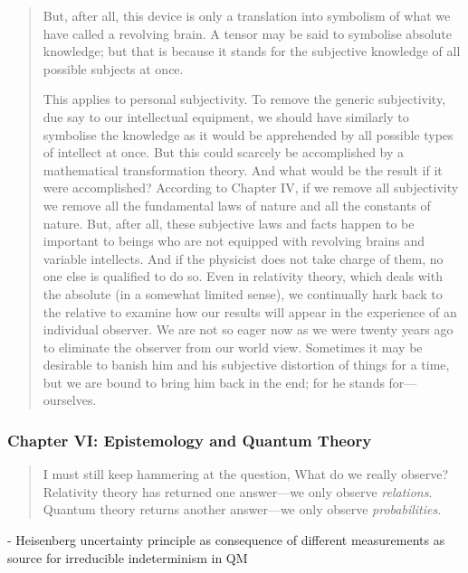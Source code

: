 \begin{quote}
    But, after all, this device is only a translation into symbolism of what we have called a revolving brain.  A tensor may be said to symbolise absolute knowledge; but that is because it stands for the subjective knowledge of all possible subjects at once.  

    This applies to personal subjectivity.  To remove the generic subjectivity, due say to our intellectual equipment, we should have similarly to symbolise the knowledge as it would be apprehended by all possible types of intellect at once.  But this could scarcely be accomplished by a mathematical transformation theory.  And what would be the result if it were accomplished?  According to Chapter IV, if we remove all subjectivity we remove all the fundamental laws of nature and all the constants of nature.  But, after all, these subjective laws and facts happen to be important to beings who are not equipped with revolving brains and variable intellects.  And if the physicist does not take charge of them, no one else is qualified to do so.  Even in relativity theory, which deals with the absolute (in a somewhat limited sense), we continually hark back to the relative to examine how our results will appear in the experience of an individual observer.  We are not so eager now as we were twenty years ago to eliminate the observer from our world view.  Sometimes it may be desirable to banish him and his subjective distortion of things for a time, but we are bound to bring him back in the end; for he stands for---ourselves. \citep[p. 85-88]{Eddington1939}
\end{quote}

\subsubsection{Chapter VI: Epistemology and Quantum Theory}

\begin{quote}
    I must still keep hammering at the question, What do we really observe?  Relativity theory has returned one answer---we only observe \emph{relations}.  Quantum theory returns another answer---we only observe \emph{probabilities}. \citep[p. 89]{Eddington1939}
\end{quote}

- Heisenberg uncertainty principle as consequence of different measurements as source for irreducible indeterminism in QM

